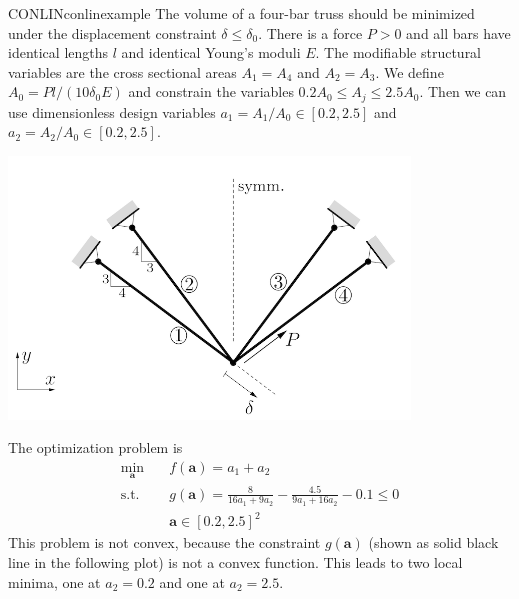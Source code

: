 \begin{example}{CONLIN}{conlinexample}
    The volume of a four-bar truss \cite{Christensen2008} should be minimized under the displacement constraint $\delta \le \delta_0$. There is a force $P>0$ and all bars have identical lengths $l$ and identical Young's moduli $E$. The modifiable structural variables are the cross sectional areas $A_1=A_4$ and $A_2=A_3$. We define $A_0 = Pl / (10\delta_0E)$ and constrain the variables $0.2A_0 \le A_j \le 2.5 A_0$. Then we can use dimensionless design variables $a_1=A_1/A_0 \in [0.2, 2.5]$ and $a_2=A_2/A_0 \in [0.2, 2.5]$.
    \begin{center}
        \includegraphics[width=0.8\textwidth]{figures/four_bar_truss_transparent.png}
    \end{center}
    The optimization problem is 
    \begin{equation}
        \begin{aligned}
            \min_{\mathbf{a}} \quad & f(\mathbf{a})= a_1 + a_2\\
            \textrm{s.t.} \quad     & g(\mathbf{a}) = \frac{8}{16a_1+9a_2} - \frac{4.5}{9a_1+16a_2} -0.1 \le 0  \\
            \quad     & \mathbf{a} \in [0.2,2.5]^2
        \end{aligned}
    \end{equation}
    This problem is not convex, because the constraint $g(\mathbf{a})$ (shown as solid black line in the following plot) is not a convex function. This leads to two local minima, one at $a_2=0.2$ and one at $a_2=2.5$.
    \begin{center}
        
    \end{center}
    

\end{example}
